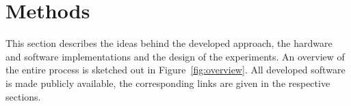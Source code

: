 \chapter{Methods}
\label{chap:methods}

This section describes the ideas behind the developed approach, the
hardware and software implementations and the design of the
experiments. An overview of the entire process is sketched out in
Figure~\ref{fig:overview}. All developed software is made publicly
available, the corresponding links are given in the respective
sections.